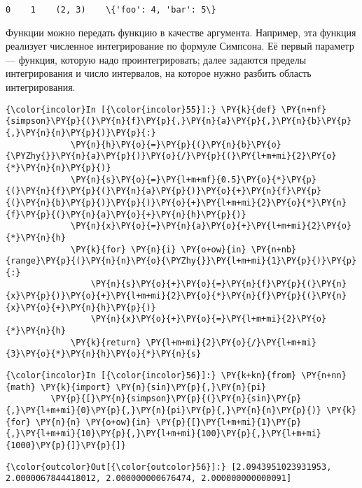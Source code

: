     \begin{Verbatim}[commandchars=\\\{\}]
0    1    (2, 3)    \{'foo': 4, 'bar': 5\}

    \end{Verbatim}

    Функции можно передать функцию в качестве аргумента. Например, эта
функция реализует численное интегрирование по формуле Симпсона. Её
первый параметр --- функция, которую надо проинтегрировать; далее задаются
пределы интегрирования и число интервалов, на которое нужно разбить
область интегрирования.

    \begin{Verbatim}[commandchars=\\\{\}]
{\color{incolor}In [{\color{incolor}55}]:} \PY{k}{def} \PY{n+nf}{simpson}\PY{p}{(}\PY{n}{f}\PY{p}{,}\PY{n}{a}\PY{p}{,}\PY{n}{b}\PY{p}{,}\PY{n}{n}\PY{p}{)}\PY{p}{:}
             \PY{n}{h}\PY{o}{=}\PY{p}{(}\PY{n}{b}\PY{o}{\PYZhy{}}\PY{n}{a}\PY{p}{)}\PY{o}{/}\PY{p}{(}\PY{l+m+mi}{2}\PY{o}{*}\PY{n}{n}\PY{p}{)}
             \PY{n}{s}\PY{o}{=}\PY{l+m+mf}{0.5}\PY{o}{*}\PY{p}{(}\PY{n}{f}\PY{p}{(}\PY{n}{a}\PY{p}{)}\PY{o}{+}\PY{n}{f}\PY{p}{(}\PY{n}{b}\PY{p}{)}\PY{p}{)}\PY{o}{+}\PY{l+m+mi}{2}\PY{o}{*}\PY{n}{f}\PY{p}{(}\PY{n}{a}\PY{o}{+}\PY{n}{h}\PY{p}{)}
             \PY{n}{x}\PY{o}{=}\PY{n}{a}\PY{o}{+}\PY{l+m+mi}{2}\PY{o}{*}\PY{n}{h}
             \PY{k}{for} \PY{n}{i} \PY{o+ow}{in} \PY{n+nb}{range}\PY{p}{(}\PY{n}{n}\PY{o}{\PYZhy{}}\PY{l+m+mi}{1}\PY{p}{)}\PY{p}{:}
                 \PY{n}{s}\PY{o}{+}\PY{o}{=}\PY{n}{f}\PY{p}{(}\PY{n}{x}\PY{p}{)}\PY{o}{+}\PY{l+m+mi}{2}\PY{o}{*}\PY{n}{f}\PY{p}{(}\PY{n}{x}\PY{o}{+}\PY{n}{h}\PY{p}{)}
                 \PY{n}{x}\PY{o}{+}\PY{o}{=}\PY{l+m+mi}{2}\PY{o}{*}\PY{n}{h}
             \PY{k}{return} \PY{l+m+mi}{2}\PY{o}{/}\PY{l+m+mi}{3}\PY{o}{*}\PY{n}{h}\PY{o}{*}\PY{n}{s}
\end{Verbatim}

    \begin{Verbatim}[commandchars=\\\{\}]
{\color{incolor}In [{\color{incolor}56}]:} \PY{k+kn}{from} \PY{n+nn}{math} \PY{k}{import} \PY{n}{sin}\PY{p}{,}\PY{n}{pi}
         \PY{p}{[}\PY{n}{simpson}\PY{p}{(}\PY{n}{sin}\PY{p}{,}\PY{l+m+mi}{0}\PY{p}{,}\PY{n}{pi}\PY{p}{,}\PY{n}{n}\PY{p}{)} \PY{k}{for} \PY{n}{n} \PY{o+ow}{in} \PY{p}{[}\PY{l+m+mi}{1}\PY{p}{,}\PY{l+m+mi}{10}\PY{p}{,}\PY{l+m+mi}{100}\PY{p}{,}\PY{l+m+mi}{1000}\PY{p}{]}\PY{p}{]}
\end{Verbatim}


    \begin{Verbatim}[commandchars=\\\{\}]
{\color{outcolor}Out[{\color{outcolor}56}]:} [2.0943951023931953, 2.0000067844418012, 2.000000000676474, 2.000000000000091]
\end{Verbatim}

